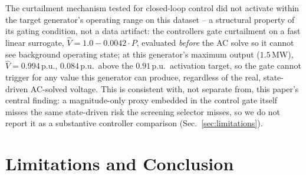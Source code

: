 \documentclass[11pt,conference]{IEEEtran}
\begin{document}
The curtailment mechanism tested for closed-loop control did not activate within the target
generator's operating range on this dataset -- a structural property of its gating condition, not a
data artifact: the controllers gate curtailment on a fast linear surrogate,
$\hat{V}=1.0-0.0042\cdot P$, evaluated \textit{before} the AC solve so it cannot see background
operating state; at this generator's maximum output ($1.5$\,MW), $\hat{V}=0.994$\,p.u., $0.084$\,p.u.\
above the $0.91$\,p.u.\ activation target, so the gate cannot trigger for any value this generator
can produce, regardless of the real, state-driven AC-solved voltage. This is consistent with, not
separate from, this paper's central finding: a magnitude-only proxy embedded in the control gate
itself misses the same state-driven risk the screening selector misses, so we do not report it as a
substantive controller
comparison (Sec.~\ref{sec:limitations}).

\section{Limitations and Conclusion}
\label{sec:conclusion}
\end{document}
